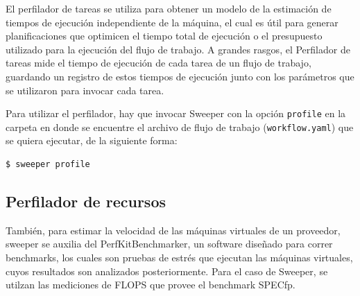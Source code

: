 El perfilador de tareas se utiliza para obtener un modelo de la estimación de tiempos de ejecución independiente de la máquina, el cual es útil para generar planificaciones que optimicen el tiempo total de ejecución o el presupuesto utilizado para la ejecución del flujo de trabajo. A grandes rasgos, el Perfilador de tareas mide el tiempo de ejecución de cada tarea de un flujo de trabajo, guardando un registro de estos tiempos de ejecución junto con los parámetros que se utilizaron para invocar cada tarea.

Para utilizar el perfilador, hay que invocar Sweeper con la opción \texttt{profile} en la carpeta en donde se encuentre el archivo de flujo de trabajo (\texttt{workflow.yaml}) que se quiera ejecutar, de la siguiente forma:

\begin{lstlisting}[language=bash]
$ sweeper profile
\end{lstlisting}


\subsection{Perfilador de recursos}

También, para estimar la velocidad de las máquinas virtuales de un proveedor, sweeper se auxilia del PerfKitBenchmarker, un software diseñado para correr benchmarks, los cuales son pruebas de estrés que ejecutan las máquinas virtuales, cuyos resultados son analizados posteriormente. Para el caso de Sweeper, se utilzan las mediciones de FLOPS que provee el benchmark SPECfp.